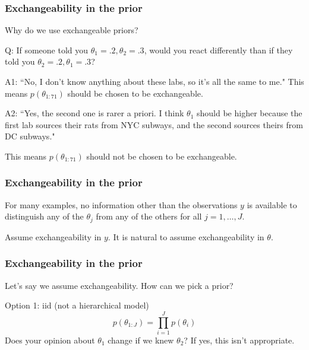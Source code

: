 \documentclass{beamer}
\begin{document}
\begin{frame}
\frametitle{Exchangeability in the prior}

Why do we use exchangeable priors?
\newline

Q: If someone told you $\theta_1 = .2, \theta_2 =.3$, would you react differently than if they told you $\theta_2 = .2, \theta_1 =.3$?
\pause
\newline

A1: ``No, I don't know anything about these labs, so it's all the same to me." 
\newline
This means $p(\theta_{1:71})$ should be chosen to be exchangeable.
\newline


A2: ``Yes, the second one is rarer a priori. I think $\theta_1$ should be higher because the first lab sources their rats from NYC subways, and the second sources theirs from DC subways." 
\newline

This means $p(\theta_{1:71})$ should not be chosen to be exchangeable.


\end{frame}


\begin{frame}
\frametitle{Exchangeability in the prior}
For many examples, no information other
than the observations $y$ is available to distinguish any of the
$\theta_j$ from any of the others for all $j = 1,\ldots, J$. 

\vspace{0.3cm}
Assume exchangeability in $y$. It is natural to assume exchangeability
in $\theta$.

\end{frame}

\begin{frame}
\frametitle{Exchangeability in the prior}

Let's say we assume exchangeability. How can we pick a prior?
\newline

Option 1: iid (not a hierarchical model)
\[
p(\theta_{1:J}) = \prod_{i=1}^{J} p(\theta_{i})
\]
Does your opinion about $\theta_1$ change if we knew $\theta_2$? If yes, this isn't appropriate.
\newline


\end{frame}
\end{document}
